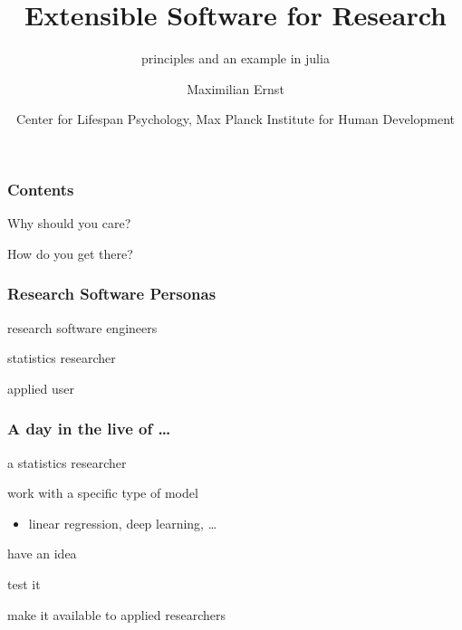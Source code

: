\documentclass{beamer}
\title{Extensible Software for Research}
\subtitle{principles and an example in julia}
\author{Maximilian Ernst}
\date{Center for Lifespan Psychology, Max Planck Institute for Human Development}
\newenvironment{wideitemize}{
    \itemize\addtolength{\itemsep}{15pt}\addtolength{\topsep}{10pt}}{\enditemize}
\begin{document}
	\setcounter{showProgressBar}{0}
	\setcounter{showSlideNumbers}{0}

	\frame{\titlepage}

	\setcounter{framenumber}{0}
	\setcounter{showProgressBar}{1}
	\setcounter{showSlideNumbers}{1}

    \begin{frame}
        \frametitle{Contents}
        \vspace{1cm}
        \begin{wideitemize}
            \item Why should you care?
        \end{wideitemize}
        \vspace{1cm}
        \begin{wideitemize}
            \item How do you get there?
        \end{wideitemize}
    \end{frame}

	\begin{frame}
        \frametitle{Research Software Personas}
        \begin{wideitemize}
            \item research software engineers
            \item statistics researcher
            \item applied user
        \end{wideitemize}
    \end{frame}

    \begin{frame}
        \frametitle{A day in the live of \ldots}
        a statistics researcher
        \vspace{0.8cm}
        \begin{wideitemize}
            \item work with a specific type of model
            \begin{itemize}
            \item linear regression, deep learning, \ldots
            \end{itemize}
            \item have an idea
            \item test it
            \item make it available to applied researchers
        \end{wideitemize}
    \end{frame}
\end{document}
